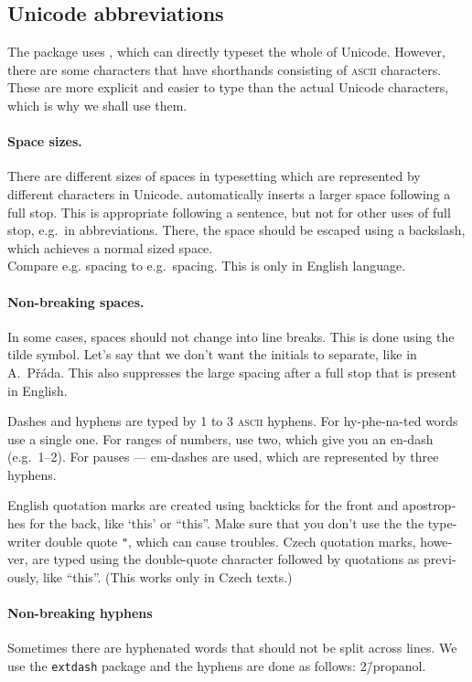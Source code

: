 \documentclass[11pt]{article}
\begin{document}
\subsection{Unicode abbreviations}
The package uses , which can directly typeset the whole of Unicode. However, there are some characters that have shorthands consisting of \textsc{ascii} characters. These are more explicit and easier to type than the actual Unicode characters, which is why we shall use them.

\paragraph{Space sizes.} There are different sizes of spaces in typesetting which are represented by different characters in Unicode.  automatically inserts a larger space following a full stop. This is appropriate following a sentence, but not for other uses of full stop, e.g.\ in abbreviations. There, the space should be escaped using a backslash, which achieves a normal sized space.
\\
\textenglish{Compare e.g. spacing to e.g.\ spacing.} This is only in English language.

\paragraph{Non-breaking spaces.} In some cases, spaces should not change into line breaks. This is done using the tilde symbol. Let's say that we don't want the initials to separate, like in A.~Přáda. This also suppresses the large spacing after a full stop that is present in English.

Dashes and hyphens are typed by 1 to 3 \textsc{ascii} hyphens. For hy-phe-na-ted words use a single one. For ranges of numbers, use two, which give you an en-dash (e.g.\ 1--2). For pauses --- em-dashes are used, which are represented by three hyphens.

\textczech{English quotation marks are created using backticks for the front and apostrophes for the back, like `this' or ``this''. Make sure that you don't use the the typewriter double quote \texttt{"}, which can cause troubles. Czech quotation marks, however, are typed using the double-quote character followed by quotations as previously, like "`this"'. (This works only in Czech texts.)}

\paragraph{Non-breaking hyphens} Sometimes there are hyphenated words that should not be split across lines. We use the \texttt{extdash} package and the hyphens are done as follows: 2\=/propanol.\label{importantsection}
\end{document}
